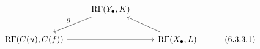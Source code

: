 \documentclass[crop,dvisvgm]{standalone}
\begin{document}
\[\begin {tikzcd}
        & \mathrm {R}\Gamma (Y_\bullet ,K)
          \ar [dl,swap,"\partial "]
      \\\mathrm {R}\Gamma (C(u),C(f))
          \ar [rr]
        && \mathrm {R}\Gamma (X_\bullet ,L)
          \ar [ul]
        & (6.3.3.1)
      \end {tikzcd}\]
\end{document}
